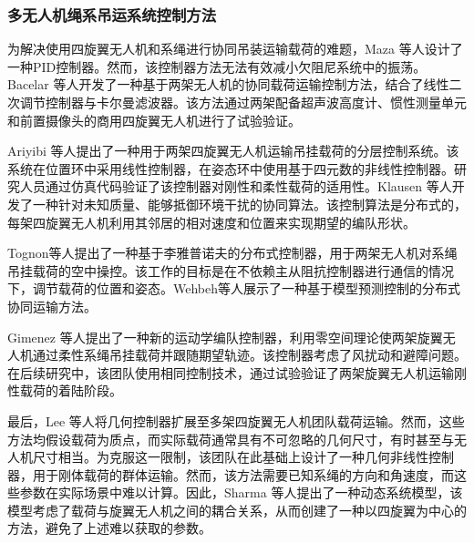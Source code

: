 \documentclass[lang=chs, degree=master, blindreview=false, winfonts=true]{yanputhesis}
\begin{document}
\subsubsection{多无人机绳系吊运系统控制方法}
为解决使用四旋翼无人机和系绳进行协同吊装运输载荷的难题，Maza 等人\cite{maza2010multi}设计了一种PID控制器。然而，该控制器方法无法有效减小欠阻尼系统中的振荡。Bacelar 等人\cite{bacelar2020board}开发了一种基于两架无人机的协同载荷运输控制方法，结合了线性二次调节控制器与卡尔曼滤波器。该方法通过两架配备超声波高度计、惯性测量单元和前置摄像头的商用四旋翼无人机进行了试验验证。

Ariyibi 等人\cite{ariyibi2020quaternion}提出了一种用于两架四旋翼无人机运输吊挂载荷的分层控制系统。该系统在位置环中采用线性控制器，在姿态环中使用基于四元数的非线性控制器。研究人员通过仿真代码验证了该控制器对刚性和柔性载荷的适用性。Klausen 等人\cite{klausen2018cooperative}开发了一种针对未知质量、能够抵御环境干扰的协同算法。该控制算法是分布式的，每架四旋翼无人机利用其邻居的相对速度和位置来实现期望的编队形状。

Tognon等人\cite{tognon2018aerial}提出了一种基于李雅普诺夫的分布式控制器，用于两架无人机对系绳吊挂载荷的空中操控。该工作的目标是在不依赖主从阻抗控制器进行通信的情况下，调节载荷的位置和姿态。Wehbeh等人\cite{wehbeh2020distributed}展示了一种基于模型预测控制的分布式协同运输方法。

Gimenez 等人\cite{gimenez2018multi}提出了一种新的运动学编队控制器，利用零空间理论使两架旋翼无人机通过柔性系绳吊挂载荷并跟随期望轨迹。该控制器考虑了风扰动和避障问题。在后续研究中，该团队使用相同控制技术，通过试验验证了两架旋翼无人机运输刚性载荷的着陆阶段\cite{gimenez2020control}。

最后，Lee 等人\cite{lee2013geometric}将几何控制器扩展至多架四旋翼无人机团队载荷运输。然而，这些方法均假设载荷为质点，而实际载荷通常具有不可忽略的几何尺寸，有时甚至与无人机尺寸相当。为克服这一限制，该团队在此基础上设计了一种几何非线性控制器，用于刚体载荷的群体运输\cite{lee2017geometric}。然而，该方法需要已知系绳的方向和角速度，而这些参数在实际场景中难以计算。因此，Sharma 等人\cite{sharma2023geometric}提出了一种动态系统模型，该模型考虑了载荷与旋翼无人机之间的耦合关系，从而创建了一种以四旋翼为中心的方法，避免了上述难以获取的参数。

\end{document}
